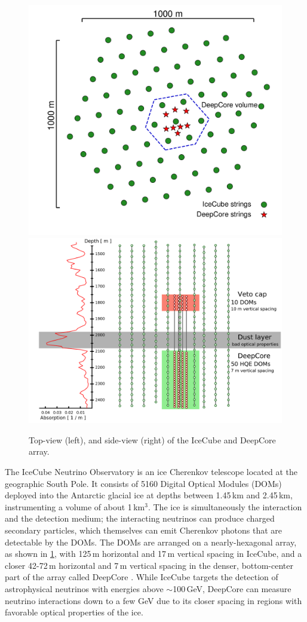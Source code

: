 \documentclass[a4paper,11pt]{article}
\begin{document}
\begin{figure}[h!]
  \includegraphics[width=.43\linewidth]{figures/icecube_top_view_bw.pdf}
  \includegraphics[width=.52\linewidth]{figures/DeepCore_sideview.png}
  \caption{Top-view (left), and side-view (right) of the IceCube and DeepCore array.}
  \label{fig:icecube_array}
\end{figure}

The IceCube Neutrino Observatory \cite{Aartsen:2016nxy} is an ice Cherenkov telescope located at the geographic South Pole. It consists of 5160 Digital Optical Modules (DOMs) deployed into the Antarctic glacial ice at depths between 1.45\,km and 2.45\,km, instrumenting a volume of about 1\,km$^{3}$. The ice is simultaneously the interaction and the detection medium; the interacting neutrinos can produce charged secondary particles, which themselves can emit Cherenkov photons that are detectable by the DOMs. The DOMs are arranged on a nearly-hexagonal array, as shown in \cref{fig:icecube_array}, with 125\,m horizontal and 17\,m vertical spacing in IceCube, and a closer 42-72\,m horizontal and 7\,m vertical spacing in the denser, bottom-center part of the array called DeepCore \cite{IceCube:2011ucd}. While IceCube targets the detection of astrophysical neutrinos with energies above $\sim$100\,GeV, DeepCore can measure neutrino interactions down to a few GeV due to its closer spacing in regions with favorable optical properties of the ice.
\end{document}
